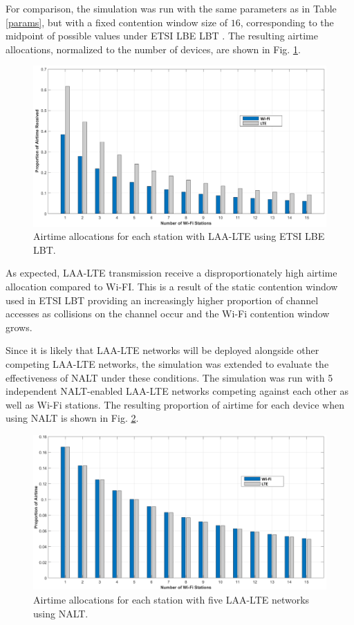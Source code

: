 For comparison, the simulation was run with the same parameters as in Table \ref{params}, but with a fixed contention window size of $16$, corresponding to the midpoint of possible values under ETSI LBE LBT \cite{3gpp}. The resulting airtime allocations, normalized to the number of devices, are shown in Fig. \ref{compresults}.
\begin{figure}[!ht]
	\includegraphics[width=\textwidth]{figures3/ETSIforComp}
	\caption{Airtime allocations for each station with LAA-LTE using ETSI LBE LBT.}
	\label{compresults}
\end{figure}
As expected, LAA-LTE transmission receive a disproportionately high airtime allocation compared to Wi-FI.  This is a result of the static contention window used in ETSI LBT providing an increasingly higher proportion of channel accesses as collisions on the channel occur and the Wi-Fi contention window grows.

Since it is likely that LAA-LTE networks will be deployed alongside other competing LAA-LTE networks, the simulation was extended to evaluate the effectiveness of NALT under these conditions.  The simulation was run with 5 independent NALT-enabled LAA-LTE networks competing against each other as well as Wi-Fi stations.  The resulting proportion of airtime for each device when using NALT is shown in Fig. \ref{multi-results}.
\begin{figure}[H]	
	\includegraphics[width=\textwidth]{figures3/NALT-5-15}
	\caption{Airtime allocations for each station with five LAA-LTE networks using NALT.}
	\label{multi-results}
\end{figure}

